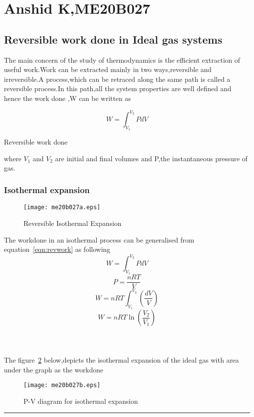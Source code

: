 \section{Anshid K,ME20B027}
\subsection{Reversible work done in Ideal gas systems}
The main concern of the study of thermodynamics is the efficient extraction of useful work.Work can be extracted mainly in two ways,reversible and irreversible.A process,which can be retraced along the same path is called a reversible process.In this path,all the system properties are well defined and hence the work done ,W can be written as

\begin{equation}
	W=\int_{V_1}^{V_2}{PdV}
	\label{eqn:revwork}
\end{equation}
\begin{center}
Reversible work done ~\cite{fleming_me027}
\end{center}
where $V_1$ and $V_2$ are initial and final volumes and P,the instantaneous pressure of gas.

\subsubsection{Isothermal expansion}
\begin{figure}[h]
	\begin{center}
		\texttt{[image: me20b027a.eps]}
	\end{center}
	\caption{Reversible Isothermal Expansion~\cite{libtex_me027}}
	\label{fig:revexp}
\end{figure}
The workdone in an isothermal process can be generalised from equation~\ref{eqn:revwork} as following
$$W=\int_{V_1}^{V_2}{PdV}$$
$$P=\frac{nRT}{V}$$
$$W=nRT\int_{V_1}^{V_2}{\left(\frac{dV}{V}\right)}$$
\begin{equation}
	W=nRT\ln\left(\frac{V_2}{V_1}\right)
\end{equation}
\\\\\\
The figure~\ref{gr:istexp} below,depicts the isothermal expansion of the ideal gas with area under the graph as the workdone

\begin{figure}[h]
	\begin{center}
		\texttt{[image: me20b027b.eps]}
	\end{center}
	\caption{P-V diagram for isothermal expansion~\cite{donev_me027}}
	\label{gr:istexp}
\end{figure}
\hrule
